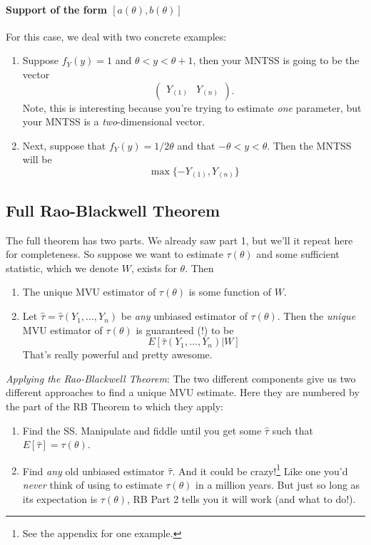 \documentclass[a4paper,12pt]{scrartcl}
\begin{document}
\paragraph{Support of the form $[a(\theta), b(\theta)]$} For
this case, we deal with two concrete examples:
\begin{enumerate}
   \item Suppose $f_Y(y) = 1$ and
      $\theta < y < \theta +1$, then your MNTSS is going to be the
      vector
	 \[ \begin{pmatrix} Y_{(1)} & Y_{(n)} \end{pmatrix}.\]
      Note, this is interesting because you're trying to estimate
      \emph{one} parameter, but your MNTSS is a \emph{two}-dimensional
      vector.
   \item Next, suppose that $f_Y(y) = 1/2\theta$ and that
      $-\theta < y < \theta$. Then the MNTSS will be
	 \[ \max\{ -Y_{(1)}, Y_{(n)}\} \]
\end{enumerate}

\subsection{Full Rao-Blackwell Theorem}

The full theorem has two parts. We already saw part 1, but we'll it
repeat here for completeness. So
suppose we want to estimate $\tau(\theta)$
and some sufficient statistic, which we denote $W$,
exists for $\theta$. Then
\begin{enumerate}
   \item The unique MVU estimator of $\tau(\theta)$ is some function
      of $W$.
   \item Let $\hat{\tau} = \hat{\tau}(Y_1, \ldots, Y_n)$ be \emph{any}
      unbiased estimator of $\tau(\theta)$. Then the \emph{unique}
      MVU estimator of $\tau(\theta)$ is guaranteed (!) to be
	 \[ E\left[\hat{\tau}(Y_1, \ldots, Y_n) | W \right] \]
      That's really powerful and pretty awesome.
\end{enumerate}
{\sl Applying the Rao-Blackwell Theorem}: The two different components
give us two different approaches to find a unique MVU estimate. Here
they are numbered by the part of the RB Theorem to which they apply:
\begin{enumerate}
   \item Find the SS. Manipulate and fiddle
      until you get some $\hat{\tau}$ such that $E[\hat{\tau}] =
      \tau(\theta)$.
   \item Find \emph{any} old unbiased estimator
      $\hat{\tau}$. And it could be crazy!\footnote{See the appendix
      for one example.} Like one you'd
      \emph{never} think of using to estimate $\tau(\theta)$ in
      a million years. But just so long as its expectation is
      $\tau(\theta)$, RB Part 2 tells you it will work
      (and what to do!).
\end{enumerate}
\end{document}
